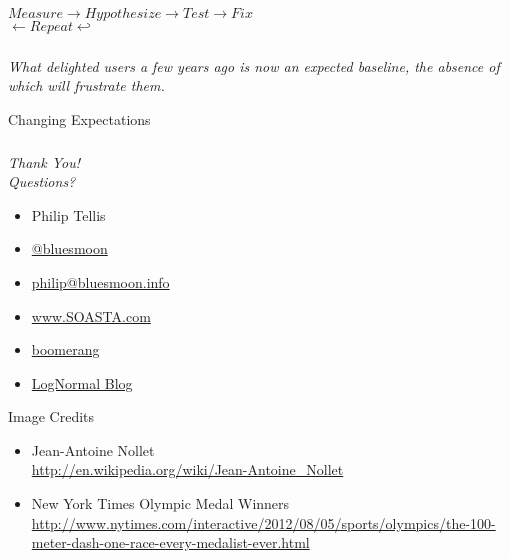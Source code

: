 \documentclass{beamer}
\newcommand{\innersplash}[1]{
  \begin{center}
    \Large \textrm{\textit{ #1 } }
  \end{center}
}
\newcommand{\splashslide}[2][{}]{
  \begin{frame}
  \frametitle{#1}
  \innersplash{#2}
  \end{frame}
}
\begin{document}
\splashslide{$ Measure \rightarrow Hypothesize \rightarrow Test \rightarrow Fix $ \\ $ \leftarrow Repeat \hookleftarrow $}

\splashslide{What delighted users a few years ago is now an expected baseline, the absence of which will frustrate them.}

\begin{frame}{Changing Expectations}
\end{frame}

\splashslide{Thank You! \\ Questions?}

\begin{frame}
  \begin{itemize}
  \item Philip Tellis
  \item \href{http://twitter.com/bluesmoon}{@bluesmoon}
  \item \href{http://bluesmoon.info/}{philip@bluesmoon.info}
  \item \href{http://www.soasta.com/}{www.SOASTA.com}
  \item \href{http://lognormal.github.com/boomerang/doc/}{boomerang}
  \item \href{http://www.lognormal.com/blog/}{LogNormal Blog}
  \end{itemize}
\end{frame}

\begin{frame}{Image Credits}
\begin{itemize}
  \item Jean-Antoine Nollet \\ \small \href{http://en.wikipedia.org/wiki/Jean-Antoine_Nollet}{http://en.wikipedia.org/wiki/Jean-Antoine\_Nollet}
  \item New York Times Olympic Medal Winners \\ \small \href{http://www.nytimes.com/interactive/2012/08/05/sports/olympics/the-100-meter-dash-one-race-every-medalist-ever.html}{http://www.nytimes.com/interactive/2012/08/05/sports/olympics/the-100-meter-dash-one-race-every-medalist-ever.html}
\end{itemize}
\end{frame}
\end{document}
